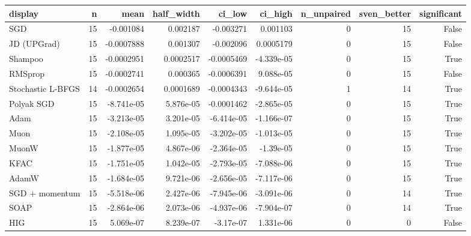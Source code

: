 \begin{tabular}{lrrrrrrrr}
\toprule
display & n & mean & half\_width & ci\_low & ci\_high & n\_unpaired & sven\_better & significant \\
\midrule
SGD & 15 & -0.001084 & 0.002187 & -0.003271 & 0.001103 & 0 & 15 & False \\
JD (UPGrad) & 15 & -0.0007888 & 0.001307 & -0.002096 & 0.0005179 & 0 & 15 & False \\
Shampoo & 15 & -0.0002951 & 0.0002517 & -0.0005469 & -4.339e-05 & 0 & 15 & True \\
RMSprop & 15 & -0.0002741 & 0.000365 & -0.0006391 & 9.088e-05 & 0 & 15 & False \\
Stochastic L-BFGS & 14 & -0.0002654 & 0.0001689 & -0.0004343 & -9.644e-05 & 1 & 14 & True \\
Polyak SGD & 15 & -8.741e-05 & 5.876e-05 & -0.0001462 & -2.865e-05 & 0 & 15 & True \\
Adam & 15 & -3.213e-05 & 3.201e-05 & -6.414e-05 & -1.166e-07 & 0 & 15 & True \\
Muon & 15 & -2.108e-05 & 1.095e-05 & -3.202e-05 & -1.013e-05 & 0 & 15 & True \\
MuonW & 15 & -1.877e-05 & 4.867e-06 & -2.364e-05 & -1.39e-05 & 0 & 15 & True \\
KFAC & 15 & -1.751e-05 & 1.042e-05 & -2.793e-05 & -7.088e-06 & 0 & 15 & True \\
AdamW & 15 & -1.684e-05 & 9.721e-06 & -2.656e-05 & -7.117e-06 & 0 & 15 & True \\
SGD + momentum & 15 & -5.518e-06 & 2.427e-06 & -7.945e-06 & -3.091e-06 & 0 & 14 & True \\
SOAP & 15 & -2.864e-06 & 2.073e-06 & -4.937e-06 & -7.904e-07 & 0 & 14 & True \\
HIG & 15 & 5.069e-07 & 8.239e-07 & -3.17e-07 & 1.331e-06 & 0 & 0 & False \\
\bottomrule
\end{tabular}
